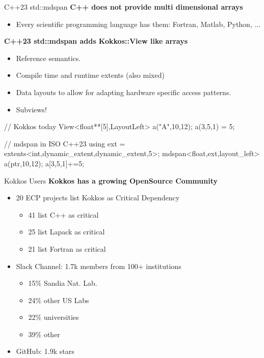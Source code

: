 \iffull
\begin{frame}[fragile]{C++23 std::mdspan}
   \textbf{C++ does not provide multi dimensional arrays}
	\begin{itemize}
           \item Every scientific programming language has them: Fortran, Matlab, Python, ... 
	\end{itemize}

	\textbf{C++23 std::mdspan adds Kokkos::View like arrays}
	\begin{itemize}
		\item Reference semantics.
		\item Compile time and runtime extents (also mixed)
		\item Data layouts to allow for adapting hardware specific access patterns. 
		\item Subviews!
	\end{itemize}

  \begin{code}[linebackgroundcolor={
      },
      keywords={View,LayoutLeft,extents,mdspan,dynamic_extent,layout_left}, frame=single
    ]
// Kokkos today
View<float**[5],LayoutLeft> a("A",10,12); a(3,5,1) = 5;

// mdspan in ISO C++23
using ext = extents<int,dynamic_extent,dynamic_extent,5>;
mdspan<float,ext,layout_left> a(ptr,10,12); a[3,5,1]+=5;
  \end{code}

\end{frame}
\fi

\begin{frame}{Kokkos Users}
\textbf{Kokkos has a growing OpenSource Community}

\vspace{0.5cm}
\begin{itemize}
  \item 20 ECP projects list Kokkos as Critical Dependency
    \begin{itemize}
       \item 41 list C++ as critical
       \item 25 list Lapack as critical
       \item 21 list Fortran as critical
    \end{itemize}
  \item Slack Channel: 1.7k members from 100+ institutions
    \begin{itemize}
      \item 15\% Sandia Nat. Lab.
      \item 24\% other US Labs
      \item 22\% universities
      \item 39\% other
    \end{itemize}
  \item GitHub: 1.9k stars
\end{itemize}



\end{frame}
